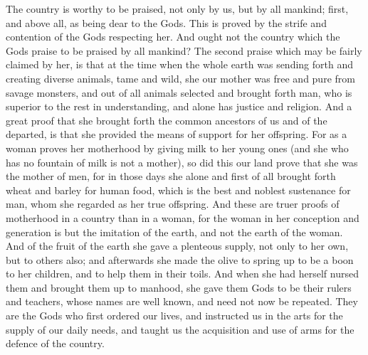 \documentclass[11pt,letter]{article}
\begin{document}
\par  The country is worthy to be praised, not only by us, but by all mankind; first, and above all, as being dear to the Gods. This is proved by the strife and contention of the Gods respecting her. And ought not the country which the Gods praise to be praised by all mankind? The second praise which may be fairly claimed by her, is that at the time when the whole earth was sending forth and creating diverse animals, tame and wild, she our mother was free and pure from savage monsters, and out of all animals selected and brought forth man, who is superior to the rest in understanding, and alone has justice and religion. And a great proof that she brought forth the common ancestors of us and of the departed, is that she provided the means of support for her offspring. For as a woman proves her motherhood by giving milk to her young ones (and she who has no fountain of milk is not a mother), so did this our land prove that she was the mother of men, for in those days she alone and first of all brought forth wheat and barley for human food, which is the best and noblest sustenance for man, whom she regarded as her true offspring. And these are truer proofs of motherhood in a country than in a woman, for the woman in her conception and generation is but the imitation of the earth, and not the earth of the woman. And of the fruit of the earth she gave a plenteous supply, not only to her own, but to others also; and afterwards she made the olive to spring up to be a boon to her children, and to help them in their toils. And when she had herself nursed them and brought them up to manhood, she gave them Gods to be their rulers and teachers, whose names are well known, and need not now be repeated. They are the Gods who first ordered our lives, and instructed us in the arts for the supply of our daily needs, and taught us the acquisition and use of arms for the defence of the country.
\end{document}

